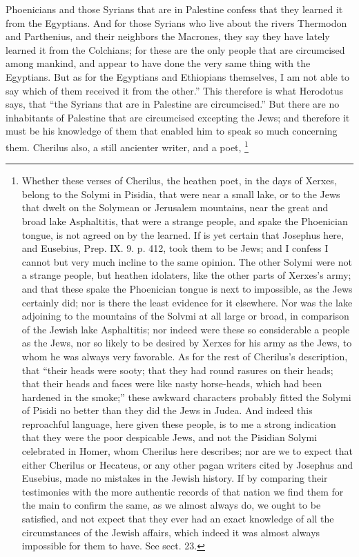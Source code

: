 Phoenicians and those Syrians that are in Palestine confess that they
learned it from the Egyptians. And for those Syrians who live about the
rivers Thermodon and Parthenius, and their neighbors the Macrones, they
say they have lately learned it from the Colchians; for these are the only
people that are circumcised among mankind, and appear to have done the
very same thing with the Egyptians. But as for the Egyptians and
Ethiopians themselves, I am not able to say which of them received it from
the other.'' This therefore is what Herodotus says, that ``the Syrians that
are in Palestine are circumcised.'' But there are no inhabitants of
Palestine that are circumcised excepting the Jews; and therefore it must
be his knowledge of them that enabled him to speak so much concerning
them. Cherilus also, a still ancienter writer, and a poet, \footnote{Whether these verses of
Cherilus, the heathen poet, in the days of Xerxes, belong to the Solymi in
Pisidia, that were near a small lake, or to the Jews that dwelt on the
Solymean or Jerusalem mountains, near the great and broad lake
Asphaltitis, that were a strange people, and spake the Phoenician tongue,
is not agreed on by the learned. If is yet certain that Josephus here, and
Eusebius, Prep. IX. 9. p. 412, took them to be Jews; and I confess I
cannot but very much incline to the same opinion. The other Solymi were
not a strange people, but heathen idolaters, like the other parts of
Xerxes's army; and that these spake the Phoenician tongue is next to
impossible, as the Jews certainly did; nor is there the least evidence for
it elsewhere. Nor was the lake adjoining to the mountains of the Solvmi at
all large or broad, in comparison of the Jewish lake Asphaltitis; nor
indeed were these so considerable a people as the Jews, nor so likely to
be desired by Xerxes for his army as the Jews, to whom he was always very
favorable. As for the rest of Cherilus's description, that ``their heads
were sooty; that they had round rasures on their heads; that their heads
and faces were like nasty horse-heads, which had been hardened in the
smoke;'' these awkward characters probably fitted the Solymi of Pisidi no
better than they did the Jews in Judea. And indeed this reproachful
language, here given these people, is to me a strong indication that they
were the poor despicable Jews, and not the Pisidian Solymi celebrated in
Homer, whom Cherilus here describes; nor are we to expect that either
Cherilus or Hecateus, or any other pagan writers cited by Josephus and
Eusebius, made no mistakes in the Jewish history. If by comparing their
testimonies with the more authentic records of that nation we find them
for the main to confirm the same, as we almost always do, we ought to be
satisfied, and not expect that they ever had an exact knowledge of all the
circumstances of the Jewish affairs, which indeed it was almost always
impossible for them to have. See sect. 23.}
